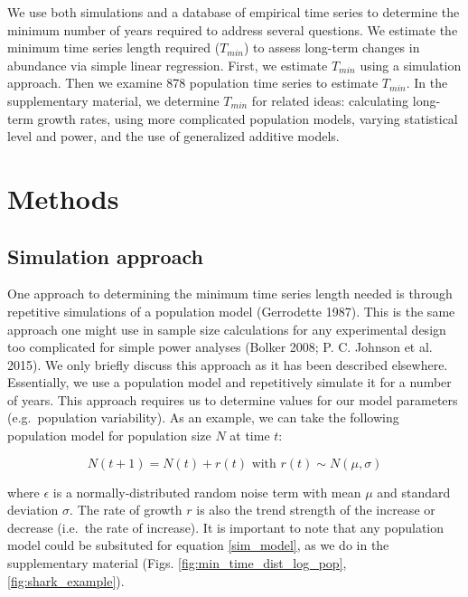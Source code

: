 \documentclass[12pt,]{article}
\begin{document}
We use both simulations and a database of empirical time series to
determine the minimum number of years required to address several
questions. We estimate the minimum time series length required
(\(T_{min}\)) to assess long-term changes in abundance via simple linear
regression. First, we estimate \(T_{min}\) using a simulation approach.
Then we examine 878 population time series to estimate \(T_{min}\). In
the supplementary material, we determine \(T_{min}\) for related ideas:
calculating long-term growth rates, using more complicated population
models, varying statistical level and power, and the use of generalized
additive models.

\section{Methods}\label{methods}

\subsection{Simulation approach}\label{simulation-approach}

One approach to determining the minimum time series length needed is
through repetitive simulations of a population model (Gerrodette 1987).
This is the same approach one might use in sample size calculations for
any experimental design too complicated for simple power analyses
(Bolker 2008; P. C. Johnson et al. 2015). We only briefly discuss this
approach as it has been described elsewhere. Essentially, we use a
population model and repetitively simulate it for a number of years.
This approach requires us to determine values for our model parameters
(e.g.~population variability). As an example, we can take the following
population model for population size \(N\) at time \(t\):

\begin{equation}
N(t + 1) = N(t) + r(t) \mbox{ with } r(t) \sim N(\mu, \sigma)
\label{sim_model}
\end{equation}

where \(\epsilon\) is a normally-distributed random noise term with mean
\(\mu\) and standard deviation \(\sigma\). The rate of growth \(r\) is
also the trend strength of the increase or decrease (i.e.~the rate of
increase). It is important to note that any population model could be
subsituted for equation \ref{sim_model}, as we do in the supplementary
material (Figs. \ref{fig:min_time_dist_log_pop},
\ref{fig:shark_example}).
\end{document}
